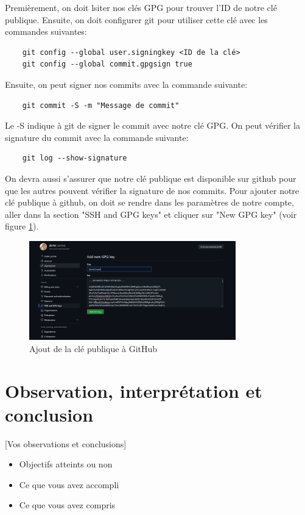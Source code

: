 \documentclass[12pt,a4paper]{article}
\begin{document}
Premièrement, on doit lsiter nos clés GPG pour trouver l'ID de notre clé publique.
Ensuite, on doit configurer git pour utiliser cette clé avec les commandes suivantes:
\begin{verbatim}
    git config --global user.signingkey <ID de la clé>
    git config --global commit.gpgsign true
\end{verbatim}

Ensuite, on peut signer nos commits avec la commande suivante:
\begin{verbatim}
    git commit -S -m "Message de commit"
\end{verbatim}

Le -S indique à git de signer le commit avec notre clé GPG.
On peut vérifier la signature du commit avec la commande suivante:
\begin{verbatim}
    git log --show-signature
\end{verbatim}

On devra aussi s'assurer que notre clé publique est disponible sur github pour que les autres
pouvent vérifier la signature de nos commits.
Pour ajouter notre clé publique à github, on doit se rendre dans les paramètres de notre compte,
aller dans la section "SSH and GPG keys" et cliquer sur "New GPG key" (voir figure \ref{gitGPG}).

\begin{figure}
    \centering
    \includegraphics[width=0.8\textwidth]{../img/gitGPG.png}
    \caption{Ajout de la clé publique à GitHub}
    \label{gitGPG}
\end{figure}

\section{Observation, interprétation et conclusion}
 [Vos observations et conclusions]
\begin{itemize}
    \item Objectifs atteints ou non
    \item Ce que vous avez accompli
    \item Ce que vous avez compris
\end{itemize}
\end{document}
